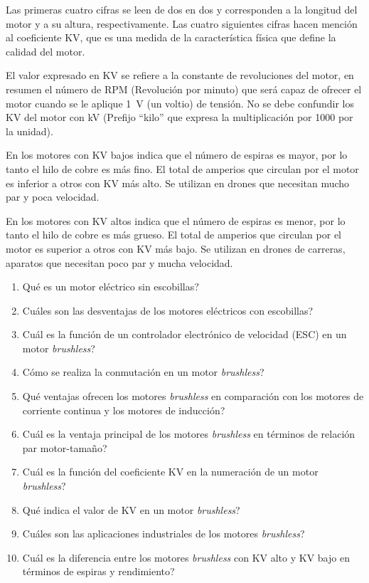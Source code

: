 \documentclass[../main]{subfiles}
\begin{document}
Las primeras cuatro cifras se leen de dos en dos y corresponden a la longitud del motor y a su altura, respectivamente. Las cuatro siguientes cifras hacen menci\'on{} al coeficiente KV, que es una medida de la caracter\'istica{} f\'isica{} que define la calidad del motor.

El valor expresado en KV se refiere a la constante de revoluciones del motor, en resumen el n\'umero{} de RPM (Revoluci\'on{} por minuto) que ser\'a{} capaz de ofrecer el motor cuando se le aplique \qty{1}{V} (un voltio) de tensi\'on{}. No se debe confundir los KV del motor con kV (Prefijo ``kilo'' que expresa la multiplicaci\'on{} por 1000 por la unidad).

En los motores con KV bajos indica que el n\'umero{} de espiras es mayor, por lo tanto el hilo de cobre es m\'as{} fino. El total de amperios que circulan por el motor es inferior a otros con KV m\'as{} alto. Se utilizan en drones que necesitan mucho par y poca velocidad.

En los motores con KV altos indica que el n\'umero{} de espiras es menor, por lo tanto el hilo de cobre es m\'as{} grueso. El total de amperios que circulan por el motor es superior a otros con KV m\'as{} bajo. Se utilizan en drones de carreras, aparatos que necesitan poco par y mucha velocidad.


\begin{enumerate}
\item \textquestiondown{}Qu\'e{} es un motor el\'ectrico{} sin escobillas?
\item \textquestiondown{}Cu\'ales{} son las desventajas de los motores el\'ectricos{} con escobillas?
\item \textquestiondown{}Cu\'al{} es la funci\'on{} de un controlador electr\'onico{} de velocidad (ESC) en un motor \emph{brushless}?
\item \textquestiondown{}C\'omo{} se realiza la conmutaci\'on{} en un motor \emph{brushless}?
\item \textquestiondown{}Qu\'e{} ventajas ofrecen los motores \emph{brushless} en comparaci\'on{} con los motores de corriente continua y los motores de inducci\'on{}?
\item \textquestiondown{}Cu\'al{} es la ventaja principal de los motores \emph{brushless} en t\'erminos{} de relaci\'on{} par motor-tama\~no{}?
\item \textquestiondown{}Cu\'al{} es la funci\'on{} del coeficiente KV en la numeraci\'on{} de un motor \emph{brushless}?
\item \textquestiondown{}Qu\'e{} indica el valor de KV en un motor \emph{brushless}?
\item \textquestiondown{}Cu\'ales{} son las aplicaciones industriales de los motores \emph{brushless}?
\item \textquestiondown{}Cu\'al{} es la diferencia entre los motores \emph{brushless} con KV alto y KV bajo en t\'erminos{} de espiras y rendimiento?
\end{enumerate}
\end{document}
